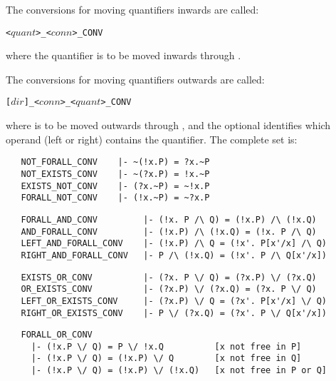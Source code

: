 The conversions for moving quantifiers inwards are called:

\begin{hol}\begin{alltt}
   <\(quant\)>_<\(conn\)>_CONV
\end{alltt}\end{hol}

\noindent where the quantifier  is to be moved inwards
through .

The conversions for moving quantifiers outwards are called:

\begin{hol}\begin{alltt}
   [\(dir\)]_<\(conn\)>_<\(quant\)>_CONV
\end{alltt}\end{hol}

\noindent where  is to be moved outwards
through , and the optional
\ml{[$dir$]} identifies which operand (left or right) contains the quantifier.
The complete set is:

\begin{hol}\begin{verbatim}
   NOT_FORALL_CONV    |- ~(!x.P) = ?x.~P
   NOT_EXISTS_CONV    |- ~(?x.P) = !x.~P
   EXISTS_NOT_CONV    |- (?x.~P) = ~!x.P
   FORALL_NOT_CONV    |- (!x.~P) = ~?x.P
\end{verbatim}\end{hol}

\begin{hol}\begin{verbatim}
   FORALL_AND_CONV         |- (!x. P /\ Q) = (!x.P) /\ (!x.Q)
   AND_FORALL_CONV         |- (!x.P) /\ (!x.Q) = (!x. P /\ Q)
   LEFT_AND_FORALL_CONV    |- (!x.P) /\ Q = (!x'. P[x'/x] /\ Q)
   RIGHT_AND_FORALL_CONV   |- P /\ (!x.Q) = (!x'. P /\ Q[x'/x])
\end{verbatim}\end{hol}

\begin{hol}\begin{verbatim}
   EXISTS_OR_CONV          |- (?x. P \/ Q) = (?x.P) \/ (?x.Q)
   OR_EXISTS_CONV          |- (?x.P) \/ (?x.Q) = (?x. P \/ Q)
   LEFT_OR_EXISTS_CONV     |- (?x.P) \/ Q = (?x'. P[x'/x] \/ Q)
   RIGHT_OR_EXISTS_CONV    |- P \/ (?x.Q) = (?x'. P \/ Q[x'/x])
\end{verbatim}\end{hol}

\begin{hol}\begin{verbatim}
   FORALL_OR_CONV
     |- (!x.P \/ Q) = P \/ !x.Q          [x not free in P]
     |- (!x.P \/ Q) = (!x.P) \/ Q        [x not free in Q]
     |- (!x.P \/ Q) = (!x.P) \/ (!x.Q)   [x not free in P or Q]
\end{verbatim}\end{hol}

